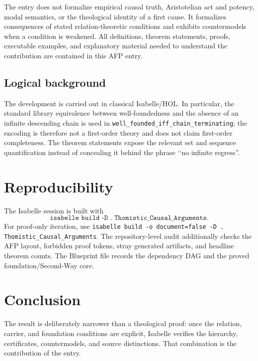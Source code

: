 \documentclass[11pt,a4paper]{article}
\begin{document}
The entry does not formalize empirical causal truth, Aristotelian act and
potency, modal semantics, or the theological identity of a first cause.  It
formalizes consequences of stated relation-theoretic conditions and exhibits
countermodels when a condition is weakened.  All definitions, theorem
statements, proofs, executable examples, and explanatory material needed to
understand the contribution are contained in this AFP entry.

\subsection{Logical background}

The development is carried out in classical Isabelle/HOL.  In particular, the
standard library equivalence between well-foundedness and the absence of an
infinite descending chain is used in
\texttt{well\_founded\_iff\_chain\_terminating}; the encoding is therefore not a
first-order theory and does not claim first-order completeness.  The theorem
statements expose the relevant set and sequence quantification instead of
concealing it behind the phrase \lq\lq no infinite regress''.

\section{Reproducibility}

The Isabelle session is built with
\[
\texttt{isabelle build -D . Thomistic\_Causal\_Arguments}.
\]
For proof-only iteration, use
\texttt{isabelle build -o document=false -D . Thomistic\_Causal\_Arguments}.
The repository-level audit additionally checks the AFP layout, forbidden proof
tokens, stray generated artifacts, and headline theorem counts.  The
Blueprint file records the dependency DAG and the proved foundation/Second-Way
core.

\section{Conclusion}

The result is deliberately narrower than a theological proof: once the
relation, carrier, and foundation conditions are explicit, Isabelle verifies
the hierarchy, certificates, countermodels, and source distinctions.  That
combination is the contribution of the entry.

\tableofcontents

\sloppy

\fussy



\end{document}
